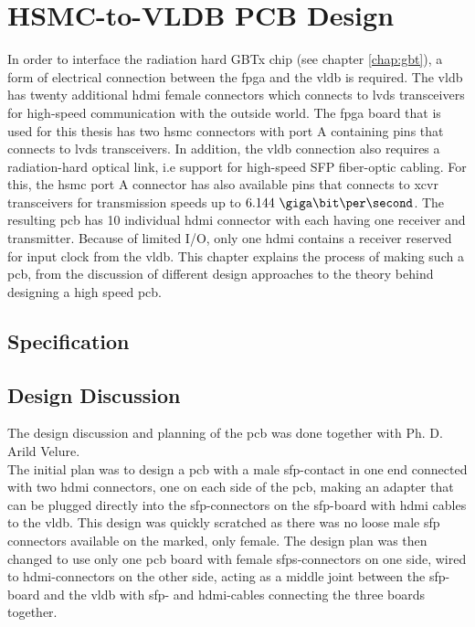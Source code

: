 \documentclass[main.tex]{subfiles}
\begin{document}
\chapter{HSMC-to-VLDB PCB Design} \label{chap:pcb}

In order to interface the radiation hard GBTx chip (see chapter \ref{chap:gbt}), a form of electrical connection between the \gls{fpga} and the \gls{vldb} is required. The \gls{vldb} has twenty additional \acrshort{hdmi} female connectors which connects to \gls{lvds} transceivers for high-speed communication with the outside world. The \gls{fpga} board that is used for this thesis has two \gls{hsmc} connectors with port A containing pins that connects to \gls{lvds} transceivers. In addition, the \gls{vldb} connection also requires a radiation-hard optical link, i.e support for high-speed SFP fiber-optic cabling. For this, the \gls{hsmc} port A connector has also available pins that connects to \gls{xcvr} transceivers for transmission speeds up to $6.144\ \giga\bit\per\second$. The resulting \acrshort{pcb} has 10 individual \gls{hdmi} connector with each having one receiver and transmitter. Because of limited I/O, only one \gls{hdmi} contains a receiver reserved for input clock from the \gls{vldb}. This chapter explains the process of making such a \gls{pcb}, from the discussion of different design approaches to the theory behind designing a high speed \gls{pcb}. \\

\section{Specification}



\section{Design Discussion}

The design discussion and planning of the \gls{pcb} was done together with Ph. D. Arild Velure.\\

The initial plan was to design a \gls{pcb} with a male \gls{sfp}-contact in one end connected with two \gls{hdmi} connectors, one on each side of the \gls{pcb}, making an adapter that can be plugged directly into the \gls{sfp}-connectors on the \gls{sfp}-board with \gls{hdmi} cables to the \gls{vldb}. This design was quickly scratched as there was no loose male \gls{sfp} connectors available on the marked, only female. The design plan was then changed to use only one \gls{pcb} board with female \glspl{sfp}-connectors on one side, wired to \gls{hdmi}-connectors on the other side, acting as a middle joint between the \gls{sfp}-board and the \gls{vldb} with \gls{sfp}- and \gls{hdmi}-cables connecting the three boards together. \\
\end{document}
